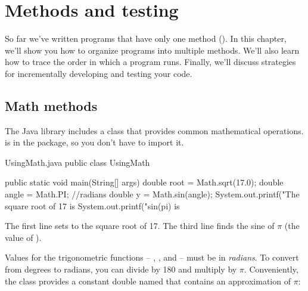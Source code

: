 \chapter{Methods and testing}

So far we've written programs that have only one method ().
In this chapter, we'll show you how to organize programs into multiple methods.
We'll also learn how to trace the order in which a program runs.
Finally, we'll discuss strategies for incrementally developing and testing your code.



\section{Math methods}



The Java library includes a  class that provides common mathematical operations.
 is in the  package, so you don't have to import it.

\begin{trinket} [210] {UsingMath.java}
public class UsingMath {

    public static void main(String[] args) {
       double root = Math.sqrt(17.0);
       double angle = Math.PI; //radians
       double y = Math.sin(angle);
       System.out.printf("The square root of 17 is %
       System.out.printf("sin(pi) is %
    }
}
\end{trinket}

The first line sets  to the square root of 17.
The third line finds the sine of $\pi$ (the value of ).


Values for the trigonometric functions -- , , and  -- must be in {\em radians}.
To convert from degrees to radians, you can divide by 180 and multiply by $\pi$.
Conveniently, the  class provides a constant double named  that contains an approximation of $\pi$:

